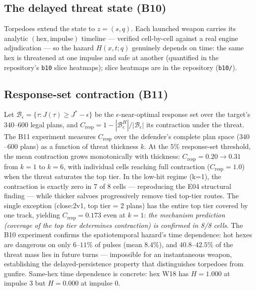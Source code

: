 \documentclass[12pt,a4paper]{article}
\begin{document}
\subsection{The delayed threat state (B10)}
Torpedoes extend the state to $z=(s,q)$.  Each launched weapon carries its
analytic $(\text{hex},\text{impulse})$ timeline --- verified cell-by-cell
against a real engine adjudication --- so the hazard
$H(x,t;q)$ genuinely depends on time: the same hex is threatened at one
impulse and safe at another (quantified in the repository's
\texttt{b10} slice heatmaps); slice heatmaps are in the repository
(\texttt{b10/}).

\subsection{Response-set contraction (B11)}
Let $\mathcal B_\epsilon=\{\tau: J(\tau)\ge J^\ast-\epsilon\}$ be the
$\epsilon$-near-optimal response set over the target's $340$--$600$ legal
plans, and
$C_{\text{resp}}=1-|\mathcal B_\epsilon^{H}|/|\mathcal B_\epsilon|$
its contraction under the threat.  The B11 experiment measures $C_{\text{resp}}$ over the defender's
complete plan space ($340$--$600$ plans) as a function of threat
thickness $k$.  At the $5\%$ response-set threshold, the mean
contraction grows monotonically with thickness: $C_{\text{resp}} =
0.20 \to 0.31$ from $k=1$ to $k=6$, with individual cells reaching
full contraction ($C_{\text{resp}} = 1.0$) when the threat saturates
the top tier.  In the low-hit regime (k=1), the contraction is exactly
zero in 7 of 8 cells --- reproducing the E04 structural finding --- while
thicker salvoes progressively remove tied top-tier routes.  The single
exception (close:2v1, top tier = 2 plans) has the entire top tier
covered by one track, yielding $C_{\text{resp}} = 0.173$ even at
$k=1$: \emph{the mechanism prediction (coverage of the top tier
determines contraction) is confirmed in 8/8 cells}.  The B10
experiment confirms the spatiotemporal hazard's time dependence: hot
hexes are dangerous on only $6$--$11\%$ of pulses (mean $8.4\%$),
and $40.8$--$42.5\%$ of the threat mass lies in future turns ---
impossible for an instantaneous weapon, establishing the
delayed-persistence property that distinguishes torpedoes from
gunfire.  Same-hex time dependence is concrete: hex W18 has
$H=1.000$ at impulse 3 but $H=0.000$ at impulse 0.
\end{document}
